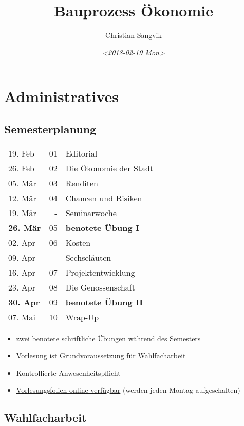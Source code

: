 \documentclass[11pt]{article}
\author{Christian Sangvik}
\date{\textit{<2018-02-19 Mon>}}
\title{Bauprozess Ökonomie}
\begin{document}
\maketitle
\tableofcontents


\section{Administratives}
\label{sec-1}

\subsection{Semesterplanung}
\label{sec-1-1}

\begin{center}
\begin{tabular}{lrl}
19. Feb & 01 & Editorial\\
26. Feb & 02 & Die Ökonomie der Stadt\\
05. Mär & 03 & Renditen\\
12. Mär & 04 & Chancen und Risiken\\
19. Mär & - & Seminarwoche\\
\textbf{26. Mär} & 05 & \textbf{benotete Übung I}\\
02. Apr & 06 & Kosten\\
09. Apr & - & Sechseläuten\\
16. Apr & 07 & Projektentwicklung\\
23. Apr & 08 & Die Genossenschaft\\
\textbf{30. Apr} & 09 & \textbf{benotete Übung II}\\
07. Mai & 10 & Wrap-Up\\
\end{tabular}
\end{center}

\begin{itemize}
\item zwei benotete schriftliche Übungen während des Semesters
\item Vorlesung ist Grundvoraussetzung für Wahlfacharbeit
\item Kontrollierte Anwesenheitspflicht
\item \href{http://www.bauprozess.arch.ethz.ch/education/MSc/BauprozessOekonomie.html}{Vorlesungsfolien online verfügbar} (werden jeden Montag aufgeschalten)
\end{itemize}

\subsection{Wahlfacharbeit}
\label{sec-1-2}
\end{document}
